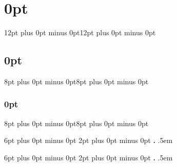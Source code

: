 \usepackage{aliascnt}
\usepackage{titlesec}

\titlespacing\section{0pt}{12pt plus 0pt minus 0pt}{12pt plus 0pt minus 0pt}
\titlespacing\subsection{0pt}{8pt plus 0pt minus 0pt}{8pt plus 0pt minus 0pt}
\titlespacing\subsubsection{0pt}{8pt plus 0pt minus 0pt}{8pt plus 0pt minus 0pt}

\titleformat{\section}[hang]{\Large\bfseries\filcenter}{\thesection}{1em}{}
\titleformat{\subsection}[hang]{\large\bfseries\filcenter}{\thesubsection}{1em}{}

\usepackage{fancyhdr}

\usepackage{amsmath,amssymb,amsthm,wasysym,stmaryrd,mathrsfs}
\usepackage[UKenglish]{babel}
\newtheorem{dummy}{***}[section]
\newcommand{\mynewtheorem}[2]{
  \newaliascnt{#1}{dummy}
  \newtheorem{#1}[#1]{#2}
  \aliascntresetthe{#1}
  \expandafter\def\csname #1autorefname\endcsname{#2}
}

%
    {6pt plus 0pt minus 0pt}%
    {2pt plus 0pt minus 0pt}%
    {\itshape}%
    {}%
    {\bfseries}%
    {\bfseries.}%
    {.5em}%
    {}%

%
    {6pt plus 0pt minus 0pt}%
    {2pt plus 0pt minus 0pt}%
    {}%
    {}%
    {\bfseries}%
    {\bfseries.}%
    {.5em}%
    {}%

